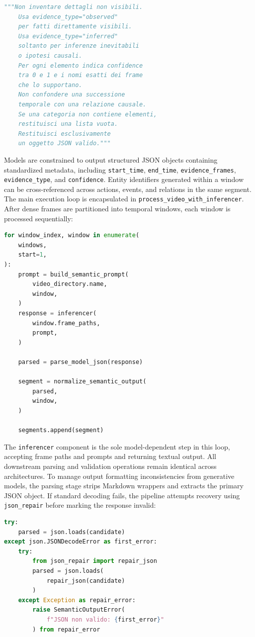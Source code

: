 \begin{lstlisting}[language=Python]
    """Non inventare dettagli non visibili.
    Usa evidence_type="observed"
    per fatti direttamente visibili.
    Usa evidence_type="inferred"
    soltanto per inferenze inevitabili
    o ipotesi causali.
    Per ogni elemento indica confidence
    tra 0 e 1 e i nomi esatti dei frame
    che lo supportano.
    Non confondere una successione
    temporale con una relazione causale.
    Se una categoria non contiene elementi,
    restituisci una lista vuota.
    Restituisci esclusivamente
    un oggetto JSON valido."""
\end{lstlisting}
Models are constrained to output structured JSON objects containing standardized metadata, including \texttt{start\_time}, \texttt{end\_time}, \texttt{evidence\_frames}, \texttt{evidence\_type}, and \texttt{confidence}. Entity identifiers generated within a window can be cross-referenced across actions, events, and relations in the same segment.
The main execution loop is encapsulated in \texttt{process\_video\_with\_inferencer}. After dense frames are partitioned into temporal windows, each window is processed sequentially:
\begin{lstlisting}[language=Python]
for window_index, window in enumerate(
    windows,
    start=1,
):
    prompt = build_semantic_prompt(
        video_directory.name,
        window,
    )
    response = inferencer(
        window.frame_paths,
        prompt,
    )

    parsed = parse_model_json(response)

    segment = normalize_semantic_output(
        parsed,
        window,
    )

    segments.append(segment)
\end{lstlisting}
The \texttt{inferencer} component is the sole model-dependent step in this loop, accepting frame paths and prompts and returning textual output. All downstream parsing and validation operations remain identical across architectures.
To manage output formatting inconsistencies from generative models, the parsing stage strips Markdown wrappers and extracts the primary JSON object. If standard decoding fails, the pipeline attempts recovery using \texttt{json\_repair} before marking the response invalid:
\begin{lstlisting}[language=Python]
try:
    parsed = json.loads(candidate)
except json.JSONDecodeError as first_error:
    try:
        from json_repair import repair_json
        parsed = json.loads(
            repair_json(candidate)
        )
    except Exception as repair_error:
        raise SemanticOutputError(
            f"JSON non valido: {first_error}"
        ) from repair_error
\end{lstlisting}
